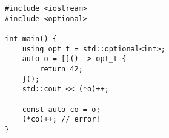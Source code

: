 \begin{lstlisting}[title=\href{https://godbolt.org/z/YY44v7}{\texttt{godbolt.org/z/YY44v7}}]
#include <iostream>
#include <optional>

int main() {
    using opt_t = std::optional<int>;
    auto o = []() -> opt_t {
        return 42;
    }();
    std::cout << (*o)++;

    const auto co = o;
    (*co)++; // error!
}
\end{lstlisting}
